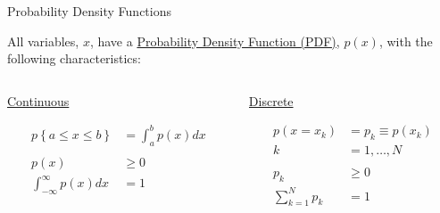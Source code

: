 \documentclass[xcolor=x11names,compress, handouts]{beamer}
\renewcommand{\(}{\begin{columns}}
\renewcommand{\)}{\end{columns}}
\newcommand{\<}[1]{\begin{column}{#1}}
\renewcommand{\>}{\end{column}}
\begin{document}
\begin{frame}{Probability Density Functions}

All variables, $x$, have a \underline{Probability Density Function (PDF)}, $p(x)$, with the following characteristics:

\begin{columns}
  \begin{column}{0.5\textwidth}
    \begin{center}
    \textcolor{berkeleygold}{\underline{Continuous}} 
    \end{center}
    \begin{align*}
    p\left\lbrace a \leq x \leq b \right\rbrace &= \int_a^b p(x)dx\\
    & \\
    p(x) & \geq 0 \\
    \int_{-\infty}^{\infty} p(x)dx &= 1
    \end{align*}
  \end{column}
  \begin{column}{0.5\textwidth}
    \begin{center}
    \textcolor{berkeleyblue}{\underline{Discrete}}  
    \end{center}
    \begin{align*}
    p(x = x_k) &= p_k \equiv p(x_k)\\
    k &= 1, \dots, N \\
    & \\
    p_k & \geq 0 \\
    \sum_{k=1}^N p_k &= 1
    \end{align*}
  \end{column}
\end{columns}

\end{frame}
\end{document}
